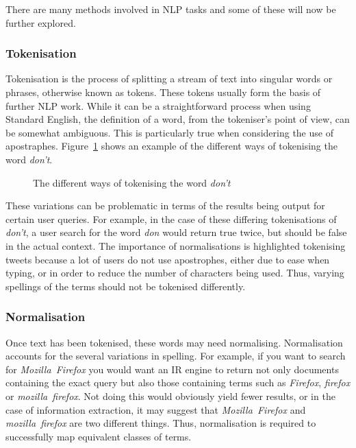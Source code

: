 There are many methods involved in NLP tasks and some of these will now be further explored.

\subsubsection{Tokenisation}
Tokenisation is the process of splitting a stream of text into singular words or phrases, otherwise known as tokens. These tokens usually form the basis of further NLP work. While it can be a straightforward process when using Standard English, the definition of a word, from the tokeniser's point of view, can be somewhat ambiguous. This is particularly true when considering the use of apostraphes. Figure~\ref{fig:tokenisation} shows an example of the different ways of tokenising the word \emph{don't}.

\begin{figure}[h!]
  \centering
  
  \caption{The different ways of tokenising the word \emph{don't}
    \label{fig:tokenisation}}
\end{figure}

These variations can be problematic in terms of the results being output for certain user queries. For example, in the case of these differing tokenisations of \emph{don't}, a user search for the word \emph{don} would return true twice, but should be false in the actual context. The importance of normalisations is highlighted tokenising tweets because a lot of users do not use apostrophes, either due to ease when typing, or in order to reduce the number of characters being used. Thus, varying spellings of the terms should not be tokenised differently.

\subsubsection{Normalisation}
Once text has been tokenised, these words may need normalising. Normalisation accounts for the several variations in spelling. For example, if you want to search for \emph{Mozilla~Firefox} you would want an IR engine to return not only documents containing the exact query but also those containing terms such as \emph{Firefox}, \emph{firefox} or \emph{mozilla~firefox}. Not doing this would obviously yield fewer results, or in the case of information extraction, it may suggest that \emph{Mozilla~Firefox} and \emph{mozilla~firefox} are two different things. Thus, normalisation is required to successfully map equivalent classes of terms.

